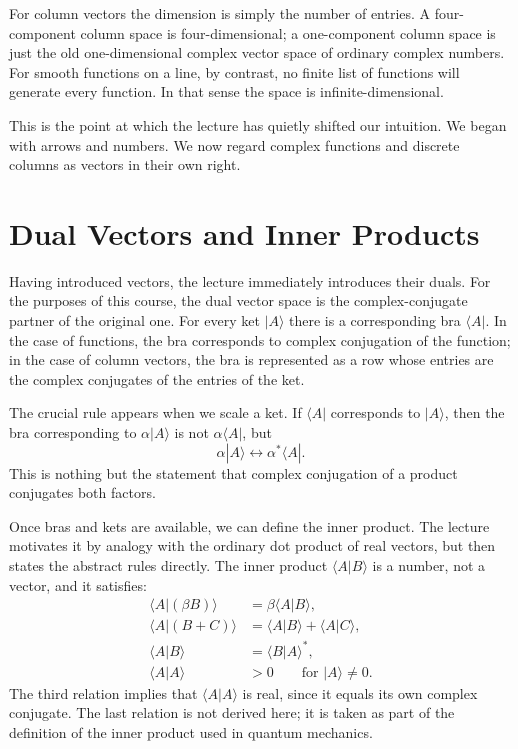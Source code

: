 For column vectors the dimension is simply the number of entries. A four-component column space is four-dimensional; a one-component column space is just the old one-dimensional complex vector space of ordinary complex numbers. For smooth functions on a line, by contrast, no finite list of functions will generate every function. In that sense the space is infinite-dimensional.

This is the point at which the lecture has quietly shifted our intuition. We began with arrows and numbers. We now regard complex functions and discrete columns as vectors in their own right.

\section{Dual Vectors and Inner Products}

Having introduced vectors, the lecture immediately introduces their duals. For the purposes of this course, the dual vector space is the complex-conjugate partner of the original one. For every ket \(|A\rangle\) there is a corresponding bra \(\langle A|\). In the case of functions, the bra corresponds to complex conjugation of the function; in the case of column vectors, the bra is represented as a row whose entries are the complex conjugates of the entries of the ket.

The crucial rule appears when we scale a ket. If \(\langle A|\) corresponds to \(|A\rangle\), then the bra corresponding to \(\alpha |A\rangle\) is not \(\alpha \langle A|\), but
\begin{equation}
\alpha |A\rangle
\longleftrightarrow
\alpha^* \langle A|.
\end{equation}
This is nothing but the statement that complex conjugation of a product conjugates both factors.

Once bras and kets are available, we can define the inner product. The lecture motivates it by analogy with the ordinary dot product of real vectors, but then states the abstract rules directly. The inner product \(\langle A|B\rangle\) is a number, not a vector, and it satisfies:
\begin{align}
\langle A|(\beta B)\rangle &= \beta \langle A|B\rangle,\\
\langle A|(B+C)\rangle &= \langle A|B\rangle + \langle A|C\rangle,\\
\langle A|B\rangle &= \langle B|A\rangle^*,\\
\langle A|A\rangle &> 0 \qquad \text{for } |A\rangle \neq 0.
\end{align}
The third relation implies that \(\langle A|A\rangle\) is real, since it equals its own complex conjugate. The last relation is not derived here; it is taken as part of the definition of the inner product used in quantum mechanics.

